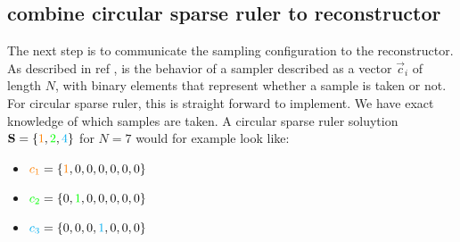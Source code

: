 \documentclass[a4paper, openany, oneside]{memoir}
\begin{document}



\subsection{combine circular sparse ruler to reconstructor}\label{sub:ci-circ}

The next step is to communicate the sampling configuration to the reconstructor. As described in ref , is the behavior of a sampler described as a vector $\vec{c}_i$ of length $N$, with binary elements that represent whether a sample is taken or not. For circular sparse ruler, this is straight forward to implement. We have exact knowledge of which samples are taken. A circular sparse ruler soluytion $\vec{S}= \{\color{orange}1\color{black},\color{green}2\color{black},\color{cyan}4\color{black}\}$ for $N=7$ would for example look like:
\begin{itemize}
\item $\color{orange}c_1 \color{black}= \{\color{orange}1\color{black},0,0,0,0,0,0\}$
\item $\color{green}c_2 \color{black}= \{0,\color{green}1\color{black},0,0,0,0,0\}$
\item $\color{cyan}c_3 \color{black}= \{0,0,0,\color{cyan}1\color{black},0,0,0\}$
\end{itemize}
\end{document}
